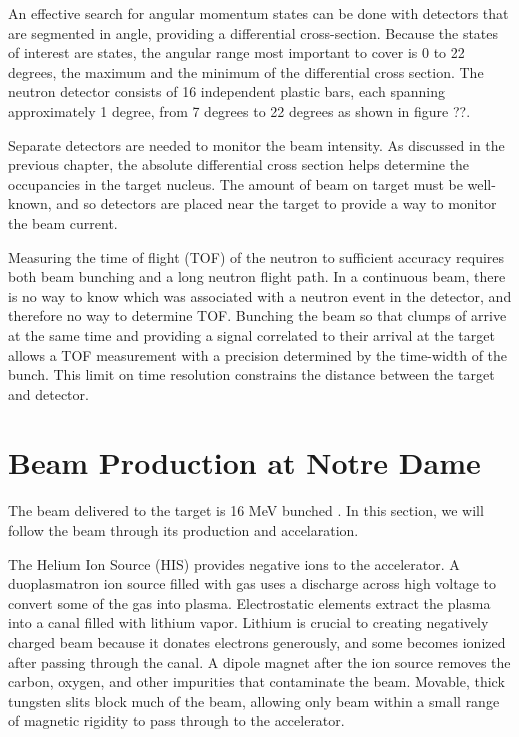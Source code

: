 An effective search for angular momentum states can be done with detectors that are segmented in angle, providing a differential cross-section.  Because the states of interest are \zp states, the angular range most important to cover is 0 to 22 degrees, the maximum and the minimum of the differential cross section.  The neutron detector consists of 16 independent plastic bars, each spanning approximately 1 degree, from 7 degrees to 22 degrees as shown in figure ??.

Separate detectors are needed to monitor the beam intensity.  As discussed in the previous chapter, the absolute differential cross section helps determine the occupancies in the target nucleus.  The amount of beam on target must be well-known, and so detectors are placed near the target to provide a way to monitor the beam current.

Measuring the time of flight (TOF) of the neutron to sufficient accuracy requires both beam bunching and a long neutron flight path.  In a continuous beam, there is no way to know which  was associated with a neutron event in the detector, and therefore no way to determine TOF.  Bunching the beam so that clumps of  arrive at the same time and providing a signal correlated to their arrival at the target allows a TOF measurement with a precision determined by the time-width of the bunch.  This limit on time resolution constrains the distance between the target and detector.  

\section{Beam Production at Notre Dame}
The beam delivered to the target is 16 MeV bunched .  In this section, we will follow the beam through its production and accelaration.

The Helium Ion Source (HIS) provides negative  ions to the accelerator.  A duoplasmatron ion source filled with  gas uses a discharge across high voltage to convert some of the gas into plasma.  Electrostatic elements extract the plasma into a canal filled with lithium vapor.  Lithium is crucial to creating negatively charged beam because it donates electrons generously, and some  becomes ionized after passing through the canal.  A dipole magnet after the ion source removes the carbon, oxygen, and other impurities that contaminate the  beam.  Movable, thick tungsten slits block much of the beam, allowing only beam within a small range of magnetic rigidity to pass through to the accelerator.

